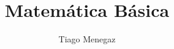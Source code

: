 \documentclass[12pt, a4paper, font, table]{article}
\author{Tiago Menegaz}
\title{Matemática Básica}
\begin{document}
	
	\renewcommand{\CancelColor}{\color{red}}




% 

% 

% 



% 

% 
\end{document}
